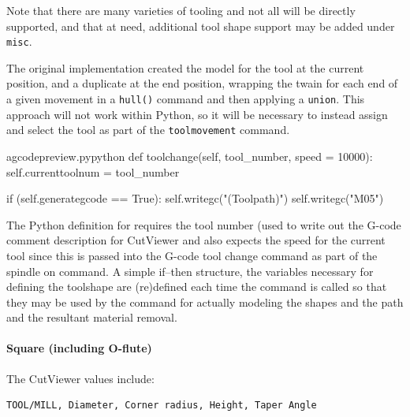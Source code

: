 \documentclass{ltxdoc}
\begin{document}

Note that there are many varieties of tooling and not all will be directly supported, and that at need, additional tool shape support may be added under \verb|misc|.
 
The original implementation created the model for the tool at the current position, and a duplicate at the end position, wrapping the twain for each end of a given movement in a \verb|hull()| command and then applying a \verb|union|. This approach will not work within Python, so it will be necessary to instead assign and select the tool as part of the \verb|toolmovement| command.

\lstset{firstnumber=\thegcpy}
\begin{writecode}{a}{gcodepreview.py}{python}
    def toolchange(self, tool_number, speed = 10000):
        self.currenttoolnum = tool_number

        if (self.generategcode == True):
            self.writegc("(Toolpath)")
            self.writegc("M05")

\end{writecode}
\addtocounter{gcpy}{23}

The Python definition for  requires the tool number (used to write out the G-code comment description for CutViewer and also expects the speed for the current tool since this is passed into the G-code tool change command as part of the spindle on command. A simple if--then structure, the variables necessary for defining the toolshape are (re)defined each time the command is called so that they may be used by the command  for actually modeling the shapes and the path and the resultant material removal.

\paragraph{Square (including O-flute)}

The CutViewer values include:

\begin{verbatim}
TOOL/MILL, Diameter, Corner radius, Height, Taper Angle
\end{verbatim}

\end{document}
